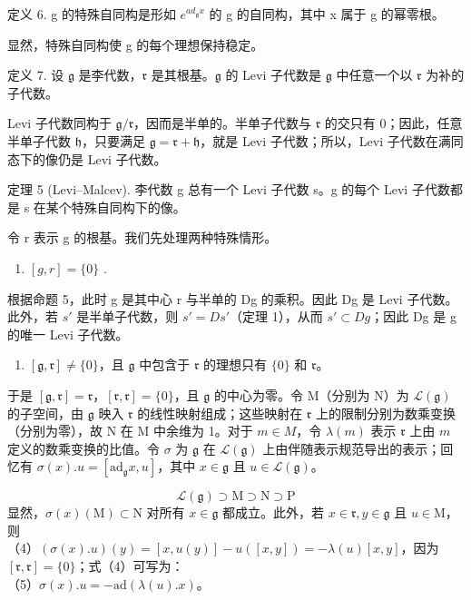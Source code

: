定义 6. g 的特殊自同构是形如 \(e^{ad_{\mathfrak{g}} x}\) 的 g 的自同构，其中 x 属于 g 的幂零根。

显然，特殊自同构使 g 的每个理想保持稳定。

定义 7. 设 \(\mathfrak{g}\) 是李代数，\(\mathfrak{r}\) 是其根基。\(\mathfrak{g}\) 的 Levi 子代数是 \(\mathfrak{g}\) 中任意一个以 \(\mathfrak{r}\) 为补的子代数。

Levi 子代数同构于 \(\mathfrak{g} / \mathfrak{r}\)，因而是半单的。半单子代数与 \(\mathfrak{r}\) 的交只有 0；因此，任意半单子代数 \(\mathfrak{h}\)，只要满足 \(\mathfrak{g} = \mathfrak{r} + \mathfrak{h}\)，就是 Levi 子代数；所以，Levi 子代数在满同态下的像仍是 Levi 子代数。

定理 5 (Levi--Malcev). 李代数 g 总有一个 Levi 子代数 s。g 的每个 Levi 子代数都是 s 在某个特殊自同构下的像。

令 r 表示 g 的根基。我们先处理两种特殊情形。

\begin{enumerate}
\def\labelenumi{(\alph{enumi})}
\tightlist
\item
  \([g, r] = \{0\}\) .
\end{enumerate}

根据命题 5，此时 g 是其中心 r 与半单的 Dg 的乘积。因此 Dg 是 Levi 子代数。此外，若 \(s'\) 是半单子代数，则 \(s' = Ds'\)（定理 1），从而 \(s' \subset Dg\)；因此 Dg 是 g 的唯一 Levi 子代数。

\begin{enumerate}
\def\labelenumi{(\alph{enumi})}
\setcounter{enumi}{1}
\tightlist
\item
  \([\mathfrak{g},\mathfrak{r}]\neq \{0\}\)，且 \(\mathfrak{g}\) 中包含于 \(\mathfrak{r}\) 的理想只有 \(\{0\}\) 和 \(\mathfrak{r}\)。
\end{enumerate}

于是 \([\mathfrak{g},\mathfrak{r}] = \mathfrak{r}\)，\([\mathfrak{r},\mathfrak{r}] = \{0\}\)，且 \(\mathfrak{g}\) 的中心为零。令 M（分别为 N）为 \(\mathcal{L}(\mathfrak{g})\) 的子空间，由 \(\mathfrak{g}\) 映入 \(\mathfrak{r}\) 的线性映射组成；这些映射在 \(\mathfrak{r}\) 上的限制分别为数乘变换（分别为零），故 N 在 M 中余维为 1。对于 \(m\in M\)，令 \(\lambda (m)\) 表示 \(\mathfrak{r}\) 上由 \(m\) 定义的数乘变换的比值。令 \(\sigma\) 为 \(\mathfrak{g}\) 在 \(\mathcal{L}(\mathfrak{g})\) 上由伴随表示规范导出的表示；回忆有 \(\sigma (x).u = [\mathrm{ad}_{\mathfrak{g}}x,u]\)，其中 \(x\in \mathfrak{g}\) 且 \(u\in \mathcal{L}(\mathfrak{g})\)。

\[
\mathcal{L}(\mathfrak{g}) \supset \mathrm{M} \supset \mathrm{N} \supset \mathrm{P}
\]
显然，\(\sigma (x)(\mathrm{M})\subset \mathrm{N}\) 对所有 \(x\in \mathfrak{g}\) 都成立。此外，若 \(x\in \mathfrak{r},y\in \mathfrak{g}\) 且 \(u\in \mathrm{M}\)，则\\
（4）\((\sigma (x).u)(y) = [x,u(y)] - u([x,y]) = -\lambda (u)[x,y]\)，因为 \([\mathfrak{r},\mathfrak{r}] = \{0\}\)；式（4）可写为：\\
（5）\(\sigma (x).u = -\mathrm{ad}(\lambda (u).x)\)。

